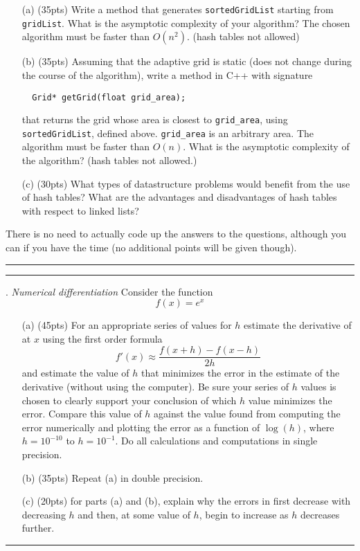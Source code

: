 \documentclass [11point]{article}
\begin{document}
\begin{itemize}
\item[(a)] (35pts) Write a method that generates {\tt{sortedGridList}} starting from {\tt{gridList}}. 
What is the asymptotic complexity of your algorithm? The chosen algorithm must be faster than $O(n^2)$. 
(hash tables not allowed)
\item[(b)] (35pts)
Assuming that the adaptive grid is static (does not change during the course of the algorithm), 
write a method in C++ with signature
\begin{verbatim}
  Grid* getGrid(float grid_area);
\end{verbatim}
that returns the grid whose area is closest to {\tt{grid\_area}}, using 
{\tt{sortedGridList}}, defined above. {\tt{grid\_area}} is an arbitrary area. The algorithm must be 
faster than $O(n)$. What is the asymptotic complexity of the algorithm? (hash tables not allowed.) 
\item[(c)] (30pts) What types of datastructure problems would benefit from the use of hash tables? 
What are the advantages and disadvantages of hash tables with respect to linked lists?
\end{itemize}

There is no need to actually code up the answers to the  questions, 
although you can if you have the time (no additional points will be given though). 

\bigskip
\hrule 





\pagebreak
\hrule 
{}. \textit{Numerical differentiation}
\bigskip
Consider the function 
$$
  f(x) = e^x
$$
\begin{itemize}
\item[(a)] (45pts) For an appropriate series of values for $h$ estimate the derivative of  
   at $x$  using the first order formula 
   $$
   f'(x) \approx \frac{f(x+h)-f(x-h)}{2h}
   $$
   and estimate the value of $h$ that minimizes the 
   error in the estimate of the derivative (without using the computer). 
   Be sure your series of $h$ values is chosen to 
   clearly support your conclusion of which $h$ value minimizes the error.
   Compare this value of $h$ against the value found from computing the error numerically 
   and plotting the error as a function of $\log(h)$, where $h=10^{-10}$ to $h=10^{-1}$.
   Do all calculations and computations in single precision. 
\item[(b)] (35pts) Repeat (a) in double precision. 
\item[(c)] (20pts) for parts (a) and (b), explain why the errors in   
     first decrease with decreasing $h$ and then, at some value of $h$, 
	 begin to increase as $h$ decreases further.
\end{itemize}

\bigskip
\hrule 
\end{document}
